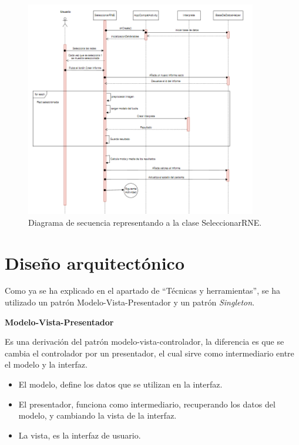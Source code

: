 \begin{figure}[!ht]
         \centering
         \includegraphics[width=0.9\textwidth]{img/Diagrama de secuencia RNE.png}
         \caption{Diagrama de secuencia representando a la clase SeleccionarRNE.}
         \label{fig:Diagrama de secuencia RNE}
\end{figure}

\section{Diseño arquitectónico}

Como ya se ha explicado en el apartado de ``Técnicas y herramientas'', se ha utilizado un patrón Modelo-Vista-Presentador y un patrón \textit{Singleton}.

\textbf{Modelo-Vista-Presentador}

Es una derivación del patrón modelo-vista-controlador, la diferencia es que se cambia el controlador por un presentador, el cual sirve como intermediario entre el modelo y la interfaz.
        \begin{itemize}
            \item El modelo, define los datos que se utilizan en la interfaz.
            \item El presentador, funciona como intermediario, recuperando los datos del modelo, y cambiando la vista de la interfaz.
            \item La vista, es la interfaz de usuario.
        \end{itemize}
        
